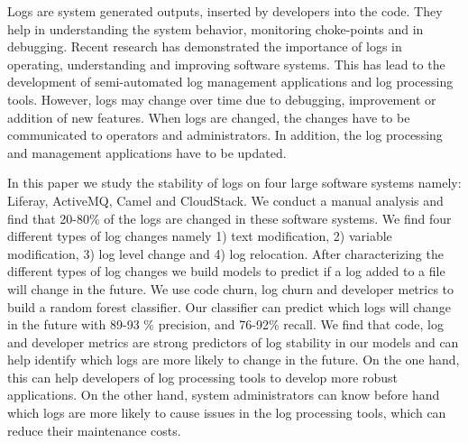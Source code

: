 Logs are system generated outputs, inserted by developers into the code. They help in understanding the system behavior, monitoring choke-points and in debugging. Recent research has demonstrated the importance of logs in operating, understanding and improving software systems. This has lead to the development of semi-automated log management applications and log processing tools. However, logs may change over time due to debugging, improvement or addition of new features. When logs are changed, the changes have to be communicated to operators and administrators. In addition, the log processing and management applications have to be updated. 

In this paper we study the stability of logs on four large software systems namely: Liferay, ActiveMQ, Camel and CloudStack. We conduct a manual analysis and find that 20-80\% of the logs are changed in these software systems. We find four different types of log changes namely 1) text modification, 2) variable modification, 3) log level change and 4) log relocation. After characterizing the different types of log changes we build models to predict if a log added to a file will change in the future. We use code churn, log churn and developer metrics to build a random forest classifier. Our classifier can predict which logs will change in the future with 89-93 \% precision, and 76-92\% recall.  We find that code, log and developer metrics are strong predictors of log stability in our models and can help identify which logs are more likely to change in the future. On the one hand, this can help developers of log processing tools to develop more robust applications. On the other hand, system administrators can know before hand which logs are more likely to cause issues in the log processing tools, which can reduce their maintenance costs.
